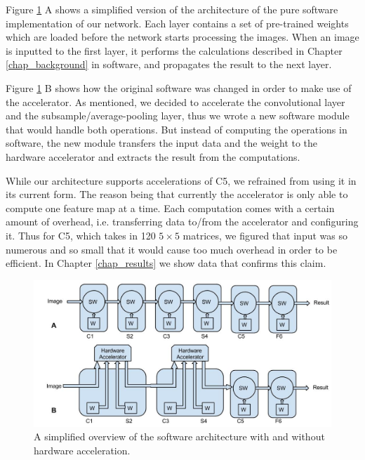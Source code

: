 Figure \ref{fig_software_architecture} A shows a simplified version of the architecture of the pure software implementation of our network. Each layer contains a set of pre-trained weights which are loaded before the network starts processing the images. When an image is inputted to the first layer, it performs the calculations described in Chapter \ref{chap_background} in software, and propagates the result to the next layer. 

Figure \ref{fig_software_architecture} B shows how the original software was changed in order to make use of the accelerator. As mentioned, we decided to accelerate the convolutional layer and the subsample/average-pooling layer, thus we wrote a new software module that would handle both operations. But instead of computing the operations in software, the new module transfers the input data and the weight to the hardware accelerator and extracts the result from the computations. 

While our architecture supports accelerations of C5, we refrained from using it in its current form. The reason being that currently the accelerator is only able to compute one feature map at a time. Each computation comes with a certain amount of overhead, i.e. transferring data to/from the accelerator and configuring it. Thus for C5, which takes in 120 $ 5 \times 5 $ matrices, we figured that input was so numerous and so small that it would cause too much overhead in order to be efficient. In Chapter \ref{chap_results} we show data that confirms this claim.


\begin{figure}[h!]
  \centering
      \includegraphics[width=1.0\textwidth]{Figures/Method/SoftwareArchitecture}
    \caption[Software architecture]{A simplified overview of the software architecture with and without hardware acceleration.}
    \label{fig_software_architecture}
\end{figure}

